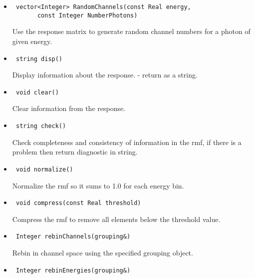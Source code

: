 \documentclass[11pt]{book}
\begin{document}
\begin{itemize}
\item  \begin{verbatim} vector<Integer> RandomChannels(const Real energy, 
       const Integer NumberPhotons) \end{verbatim}

          Use the response matrix to generate random channel numbers 
          for a photon of given energy.

\item  \begin{verbatim} string disp() \end{verbatim}

          Display information about the response. - return as a string.

\item  \begin{verbatim} void clear() \end{verbatim}

          Clear information from the response.

\item  \begin{verbatim} string check() \end{verbatim}

          Check completeness and consistency of information in the rmf,
          if there is a problem then return diagnostic in string.

\item  \begin{verbatim} void normalize() \end{verbatim}
  
          Normalize the rmf so it sums to 1.0 for each energy bin.

\item  \begin{verbatim} void compress(const Real threshold) \end{verbatim}

          Compress the rmf to remove all elements below the threshold value.

\item  \begin{verbatim} Integer rebinChannels(grouping&) \end{verbatim}

          Rebin in channel space using the specified grouping object.

\item  \begin{verbatim} Integer rebinEnergies(grouping&) \end{verbatim}


\end{itemize}
\end{document}
